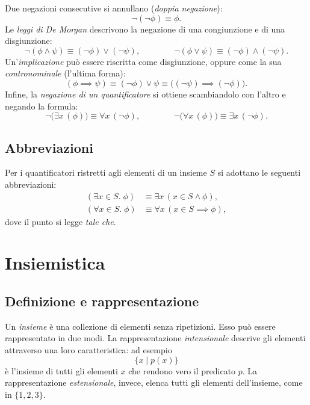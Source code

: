 \documentclass[a4paper, 11pt, oneside]{book}
\theoremstyle{formale}
\begin{document}
    Due negazioni consecutive si annullano (\emph{doppia negazione}):
    \begin{equation*}
        \neg (\neg \phi) \equiv \phi.
    \end{equation*}
    Le \emph{leggi di De Morgan} descrivono la negazione di una congiunzione e di una
    disgiunzione:
    \begin{equation*}
        \neg (\phi \land \psi) \equiv (\neg \phi) \lor (\neg \psi),
        \qquad\qquad
        \neg (\phi \lor \psi) \equiv (\neg \phi) \land (\neg \psi).
    \end{equation*}
    Un'\emph{implicazione} pu\`o essere riscritta come disgiunzione, oppure come la sua
    \emph{contronominale} (l'ultima forma):
    \begin{equation*}
        (\phi \implies \psi)
        \equiv (\neg \phi) \lor \psi
        \equiv \bigl((\neg \psi) \implies (\neg \phi)\bigr).
    \end{equation*}
    Infine, la \emph{negazione di un quantificatore} si ottiene scambiandolo con l'altro e
    negando la formula:
    \begin{equation*}
        \neg \bigl(\exists x \, (\phi)\bigr) \equiv \forall x \, (\neg \phi),
        \qquad\qquad
        \neg \bigl(\forall x \, (\phi)\bigr) \equiv \exists x \, (\neg \phi).
    \end{equation*}

    \subsection{Abbreviazioni}
    Per i quantificatori ristretti agli elementi di un insieme $S$ si adottano le seguenti
    abbreviazioni:
    \begin{align*}
        (\exists x \in S.\; \phi) &\equiv \exists x \, (x \in S \land \phi), \\
        (\forall x \in S.\; \phi) &\equiv \forall x \, (x \in S \implies \phi),
    \end{align*}
    dove il punto si legge \emph{tale che}.

    \section{Insiemistica}
    \subsection{Definizione e rappresentazione}
    Un \emph{insieme} \`e una collezione di elementi senza ripetizioni. Esso pu\`o essere
    rappresentato in due modi. La rappresentazione \emph{intensionale} descrive gli
    elementi attraverso una loro caratteristica: ad esempio
    \begin{equation*}
        \{x \mid p(x)\}
    \end{equation*}
    \`e l'insieme di tutti gli elementi $x$ che rendono vero il predicato $p$. La
    rappresentazione \emph{estensionale}, invece, elenca tutti gli elementi
    dell'insieme, come in $\{1, 2, 3\}$.
\end{document}
